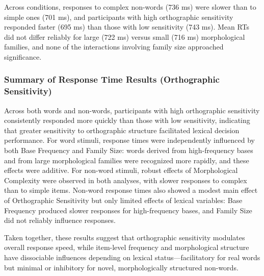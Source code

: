 		Across conditions, responses to complex non-words (736 ms) were slower than to simple ones (701 ms), and participants with high orthographic sensitivity responded faster (695 ms) than those with low sensitivity (743 ms). Mean RTs did not differ reliably for large (722 ms) versus small (716 ms) morphological families, and none of the interactions involving family size approached significance.

		
	\subsubsection{Summary of Response Time Results (Orthographic Sensitivity)}
		
	Across both words and non-words, participants with high orthographic sensitivity consistently responded more quickly than those with low sensitivity, indicating that greater sensitivity to orthographic structure facilitated lexical decision performance. For word stimuli, response times were independently influenced by both Base Frequency and Family Size: words derived from high-frequency bases and from large morphological families were recognized more rapidly, and these effects were additive. For non-word stimuli, robust effects of Morphological Complexity were observed in both analyses, with slower responses to complex than to simple items. Non-word response times also showed a modest main effect of Orthographic Sensitivity but only limited effects of lexical variables: Base Frequency produced slower responses for high-frequency bases, and Family Size did not reliably influence responses. 
	
	Taken together, these results suggest that orthographic sensitivity modulates overall response speed, while item-level frequency and morphological structure have dissociable influences depending on lexical status—facilitatory for real words but minimal or inhibitory for novel, morphologically structured non-words.
		
